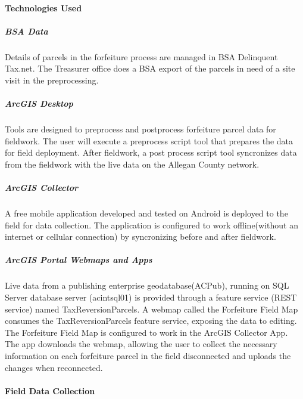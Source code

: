 \documentclass[class=article , crop=false, titlepage, twoside, multi={itemize, figure, verbatim}, float=false]{standalone}
\begin{document}
\paragraph{Technologies Used}
\subparagraph{BSA Data}Details of parcels in the forfeiture process are managed in BSA Delinquent Tax.net.  The Treasurer office does a BSA export of the parcels in need of a site visit in the preprocessing.

\subparagraph{ArcGIS Desktop}Tools are designed to preprocess and postprocess forfeiture parcel data for fieldwork.  The user will execute a preprocess script tool that prepares the data for field deployment.  After fieldwork, a post process script tool syncronizes data from the fieldwork with the live data on the Allegan County network. 

\subparagraph{ArcGIS Collector}A free mobile application developed and tested on Android is deployed to the field for data collection.  The application is configured to work offline(without an internet or cellular connection) by syncronizing before and after fieldwork.

\subparagraph{ArcGIS Portal Webmaps and Apps}Live data from a publishing enterprise geodatabase(ACPub), running on SQL Server database server (acintsql01) is provided through a feature service (REST service)  named TaxReversionParcels.  A webmap called the Forfeiture Field Map consumes the TaxReversionParcels feature service, exposing the data to editing.  The Forfeiture Field Map is configured to work in the ArcGIS Collector App.  The app downloads the webmap, allowing the user to collect the necessary information on each forfeiture parcel in the field disconnected and uploads the changes when reconnected. 

\paragraph{Field Data Collection}
\end{document}
